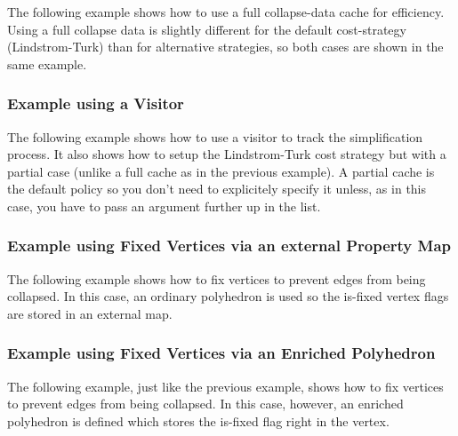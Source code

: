 The following example shows how to use a full collapse-data cache for efficiency. Using a full collapse data is slightly different for the default cost-strategy (Lindstrom-Turk) than for alternative strategies, so both cases are shown in the same example.


\subsubsection{Example using a Visitor}

The following example shows how to use a visitor to track the simplification process. It also shows how to setup the Lindstrom-Turk cost strategy but with a partial case (unlike a full cache as in the previous example). A partial cache is the default policy so you don't need to explicitely specify it unless, as in this case, you have to pass an argument further up in the list.



\subsubsection{Example using Fixed Vertices via an external Property Map}

The following example shows how to fix vertices to prevent edges from being collapsed. In this case, an ordinary polyhedron is used so the is-fixed vertex flags are stored in an external map.


\subsubsection{Example using Fixed Vertices via an Enriched Polyhedron}

The following example, just like the previous example, shows how to fix vertices to prevent edges from being collapsed. In this case, however, an enriched polyhedron is defined which stores the is-fixed flag right in the vertex.




